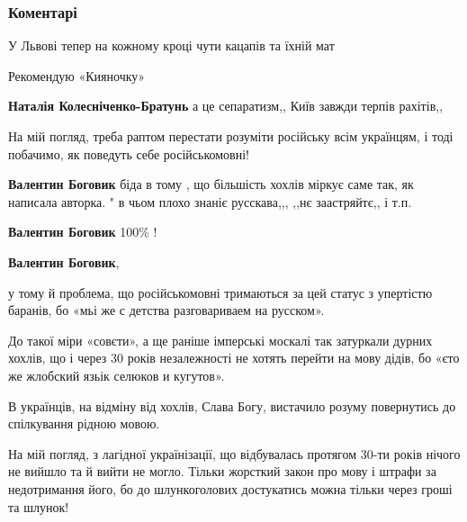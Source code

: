  
 
 
 
 
\subsubsection{Коментарі}

\begin{itemize} %
У Львові тепер на кожному кроці чути кацапів та їхній мат

Рекомендую «Кияночку»

\begin{itemize} %
\textbf{Наталія Колесніченко-Братунь} а це сепаратизм,, Київ завжди терпів рахітів,,
\end{itemize} %

На мій погляд, треба раптом перестати розуміти російську всім українцям, і тоді
побачимо, як поведуть себе російськомовні!

\begin{itemize} %
\textbf{Валентин Боговик} біда в тому , що більшість хохлів міркує саме так, як написала авторка. " в чьом плохо знаніє русскава,,, ,,нє заастряйтє,, і т.п.

\textbf{Валентин Боговик} 100\% !

\textbf{Валентин Боговик}, 

у тому й проблема, що російськомовні тримаються за цей статус з упертістю
баранів, бо «мьі же с детства разговариваем на русском».

До такої міри «совєти», а ще раніше імперські москалі так затуркали дурних
хохлів, що і через 30 років незалежності не хотять перейти на мову дідів, бо
«єто же жлобский язьік селюков и кугутов».

В українців, на відміну від хохлів, Слава Богу, вистачило розуму повернутись до
спілкування рідною мовою.

На мій погляд, з лагідної українізації, що відбувалась протягом 30-ти років
нічого не вийшло та й вийти не могло. Тільки жорсткий закон про мову і штрафи
за недотримання його, бо до шлункоголових достукатись можна тільки через гроші
та шлунок!


\end{itemize}
\end{itemize}
